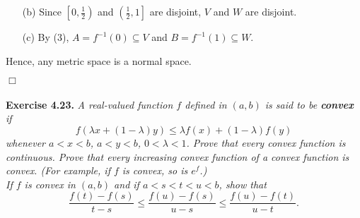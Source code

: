 \documentclass{article}
\begin{document}
\begin{enumerate}
\begin{enumerate}
  \item[(b)]
  Since $\left[0,\frac{1}{2}\right)$ and $\left(\frac{1}{2},1\right]$ are disjoint,
  $V$ and $W$ are disjoint.

  \item[(c)]
  By (3), $A = f^{-1}(0) \subseteq V$ and $B = f^{-1}(1) \subseteq W$.
  \end{enumerate}
Hence, any metric space is a normal space.
\end{enumerate}
$\Box$\\\\






\textbf{Exercise 4.23.}
\emph{A real-valued function $f$ defined in $(a,b)$
is said to be \textbf{convex} if
$$f(\lambda x + (1 - \lambda) y) \leq \lambda f(x) + (1 - \lambda) f(y)$$
whenever $a < x < b$, $a < y < b$, $0 < \lambda < 1$.
Prove that every convex function is continuous.
Prove that every increasing convex function of a convex function is convex.
(For example, if $f$ is convex, so is $e^f$.)} \\

\emph{If $f$ is convex in $(a,b)$ and if $a < s < t < u < b$,
show that
$$\frac{f(t)-f(s)}{t-s}
\leq \frac{f(u)-f(s)}{u-s}
\leq \frac{f(u)-f(t)}{u-t}.$$} \\
\end{document}
